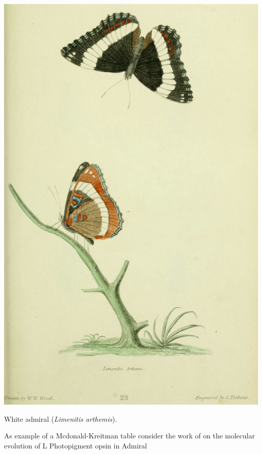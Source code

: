 \begin{marginfigure}
\begin{center}
\includegraphics[width= \textwidth]{illustration_images/Genetic_drift/Limenitis_arthemis/Limenitis.png}
\end{center}
\caption{White admiral ({\it Limenitis arthemis}). } \label{fig:Limenitis}
\end{marginfigure}
As example of a Mcdonald-Kreitman table consider the work of \citet{frentiu2007adaptive} on the molecular evolution of L Photopigment opsin in Admiral
